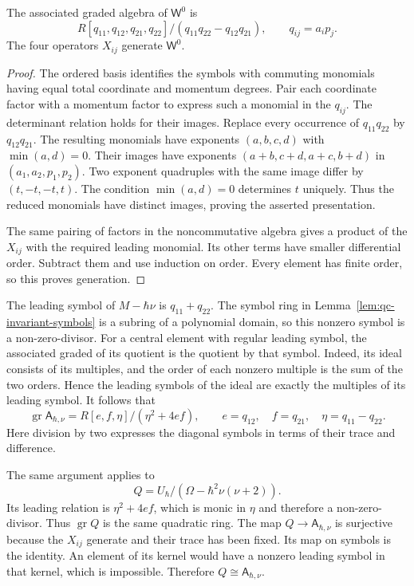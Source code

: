 \begin{lemma}\label{lem:qc-invariant-symbols}
The associated graded algebra of $\mathsf W^0$ is
\[
 R[q_{11},q_{12},q_{21},q_{22}]/(q_{11}q_{22}-q_{12}q_{21}),
 \qquad q_{ij}=a_i p_j.
\]
The four operators $X_{ij}$ generate $\mathsf W^0$.
\end{lemma}
\begin{proof}
The ordered basis identifies the symbols with commuting monomials having equal total coordinate and momentum degrees.
Pair each coordinate factor with a momentum factor to express such a monomial in the $q_{ij}$.
The determinant relation holds for their images.
Replace every occurrence of $q_{11}q_{22}$ by $q_{12}q_{21}$.
The resulting monomials have exponents $(a,b,c,d)$ with $\min(a,d)=0$.
Their images have exponents $(a+b,c+d,a+c,b+d)$ in $(a_1,a_2,p_1,p_2)$.
Two exponent quadruples with the same image differ by $(t,-t,-t,t)$.
The condition $\min(a,d)=0$ determines $t$ uniquely.
Thus the reduced monomials have distinct images, proving the asserted presentation.

The same pairing of factors in the noncommutative algebra gives a product of the $X_{ij}$ with the required leading monomial.
Its other terms have smaller differential order.
Subtract them and use induction on order.
Every element has finite order, so this proves generation.
\end{proof}

The leading symbol of $M-\hbar\nu$ is $q_{11}+q_{22}$.
The symbol ring in Lemma~\ref{lem:qc-invariant-symbols} is a subring of a polynomial domain, so this nonzero symbol is a non-zero-divisor.
For a central element with regular leading symbol, the associated graded of its quotient is the quotient by that symbol.
Indeed, its ideal consists of its multiples, and the order of each nonzero multiple is the sum of the two orders.
Hence the leading symbols of the ideal are exactly the multiples of its leading symbol.
It follows that
\[
 \operatorname{gr}\mathsf A_{\hbar,\nu}
 =R[e,f,\eta]/(\eta^2+4ef),
 \qquad e=q_{12},\quad f=q_{21},\quad \eta=q_{11}-q_{22}.
\]
Here division by two expresses the diagonal symbols in terms of their trace and difference.

The same argument applies to
\[
 Q=U_\hbar/(\Omega-\hbar^2\nu(\nu+2)).
\]
Its leading relation is $\eta^2+4ef$, which is monic in $\eta$ and therefore a non-zero-divisor.
Thus $\operatorname{gr}Q$ is the same quadratic ring.
The map $Q\to\mathsf A_{\hbar,\nu}$ is surjective because the $X_{ij}$ generate and their trace has been fixed.
Its map on symbols is the identity.
An element of its kernel would have a nonzero leading symbol in that kernel, which is impossible.
Therefore $Q\cong\mathsf A_{\hbar,\nu}$.

